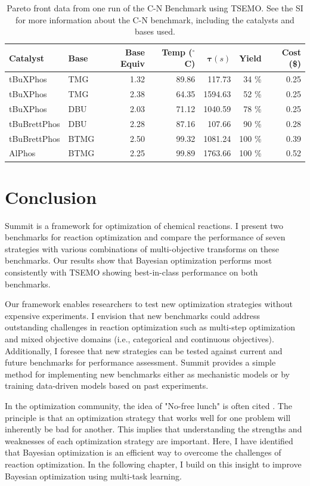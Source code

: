 \begin{table}[tb]
    \centering
    \caption{Pareto front data from one run of the C-N Benchmark using TSEMO. See the SI for more information about the C-N benchmark, including the catalysts and bases used.
    }
    \begin{tabular}{llrrrrr}
    \hline
         \textbf{Catalyst} &  \textbf{Base} & \textbf{Base Equiv} & \textbf{Temp ($^{\circ}$ C)} &       $\mathbf{\tau} (s)$ &     \textbf{Yield} &      \textbf{Cost (\$)} \\
    \hline
     tBuXPhos &   TMG &             1.32 &       89.86 &   117.73 &  34 \% &  0.25 \\
     tBuXPhos &   TMG &             2.38 &       64.35 &  1594.63 &  52 \% &  0.25 \\
     tBuXPhos &   DBU &             2.03 &       71.12 &  1040.59 &  78 \% &  0.25 \\
 tBuBrettPhos &   DBU &             2.28 &       87.16 &   107.66 &  90 \% &  0.28 \\
 tBuBrettPhos &  BTMG &             2.50 &       99.32 &  1081.24 &  100 \% &  0.39 \\
       AlPhos &  BTMG &             2.25 &       99.89 &  1763.66 &  100 \% &  0.52 \\
    \end{tabular}

    \label{tab:cn_benchmark_results}
\end{table}

\section{Conclusion}

Summit is a framework for optimization of chemical reactions. I present two benchmarks for reaction optimization and compare the performance of seven strategies with various combinations of multi-objective transforms on these benchmarks. Our results show that Bayesian optimization performs most consistently with TSEMO showing best-in-class performance on both benchmarks.

Our framework enables researchers to test new optimization strategies without expensive experiments. I envision that new benchmarks could address outstanding challenges in reaction optimization such as multi-step optimization \cite{Coley2019, Clayton2020} and mixed objective domains (i.e., categorical and continuous objectives). Additionally, I foresee that new strategies can be tested against current and future benchmarks for performance assessment. Summit provides a simple method for implementing new benchmarks either as mechanistic models or by training data-driven models based on past experiments.

In the optimization community, the idea of "No-free lunch" is often cited \cite{Wolpert1997}. The principle is that an optimization strategy that works well for one problem will inherently be bad for another.  This implies that understanding the strengths and weaknesses of each optimization strategy are important. Here, I have identified that Bayesian optimization is an efficient way to overcome the challenges of reaction optimization. In the following chapter, I build on this insight to improve Bayesian optimization using multi-task learning.
